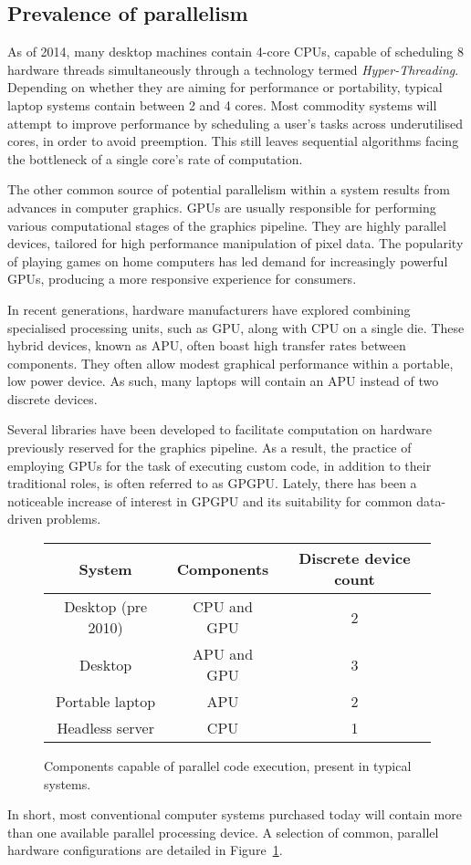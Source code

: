 \subsection{Prevalence of parallelism}
As of 2014, many desktop machines contain 4-core \acp{CPU}, capable of scheduling 8 hardware threads simultaneously through a technology termed \emph{Hyper-Threading}\cite{marr2002hyper}.
Depending on whether they are aiming for performance or portability, typical laptop systems contain between 2 and 4 cores.
Most commodity systems will attempt to improve performance by scheduling a user's tasks across underutilised cores, in order to avoid preemption. This still leaves sequential algorithms facing the bottleneck of a single core's rate of computation.

The other common source of potential parallelism within a system results from advances in computer graphics.
\acp{GPU} are usually responsible for performing various computational stages of the graphics pipeline. They are highly parallel devices, tailored for high performance manipulation of pixel data. The popularity of playing games on home computers has led demand for increasingly powerful \acp{GPU}, producing a more responsive experience for consumers.

In recent generations, hardware manufacturers have explored combining specialised processing units, such as \ac{GPU}, along with \ac{CPU} on a single die. These hybrid devices, known as \ac{APU}, often boast high transfer rates between components. They often allow modest graphical performance within a portable, low power device. As such, many laptops will contain an \ac{APU} instead of two discrete devices.

Several libraries have been developed to facilitate computation on hardware previously reserved for the graphics pipeline. As a result, the practice of employing \acp{GPU} for the task of executing custom code, in addition to their traditional roles, is often referred to as \ac{GPGPU}.
Lately, there has been a noticeable increase of interest in \ac{GPGPU} and its suitability for common data-driven problems.

\begin{figure}
\begin{center}
  \begin{tabular}{ | c | c | c |}
    \hline
    System & Components & Discrete device count \\ \hline
    Desktop (pre 2010) & \ac{CPU} and \ac{GPU} & 2 \\ \hline
    Desktop & \ac{APU} and \ac {GPU} & 3 \\ \hline
    Portable laptop & \ac{APU} & 2 \\ \hline
    Headless server & \ac{CPU} & 1 \\ \hline
    \end{tabular}
  \caption{Components capable of parallel code execution, present in typical systems.}
  \label{fig:par_table}
\end{center}
\end{figure}

In short, most conventional computer systems purchased today will contain more than one available parallel processing device. A selection of common, parallel hardware configurations are detailed in Figure~\ref{fig:par_table}.
